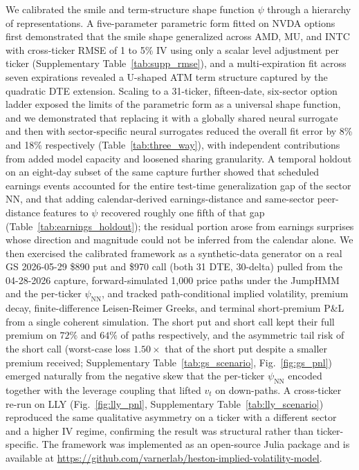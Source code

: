 We calibrated the smile and term-structure shape function $\psi$ through a hierarchy of representations. A five-parameter parametric form fitted on NVDA options first demonstrated that the smile shape generalized across AMD, MU, and INTC with cross-ticker RMSE of 1 to 5\% IV using only a scalar level adjustment per ticker (Supplementary Table~\ref{tab:supp_rmse}), and a multi-expiration fit across seven expirations revealed a U-shaped ATM term structure captured by the quadratic DTE extension. Scaling to a 31-ticker, fifteen-date, six-sector option ladder exposed the limits of the parametric form as a universal shape function, and we demonstrated that replacing it with a globally shared neural surrogate and then with sector-specific neural surrogates reduced the overall fit error by 8\% and 18\% respectively (Table~\ref{tab:three_way}), with independent contributions from added model capacity and loosened sharing granularity. A temporal holdout on an eight-day subset of the same capture further showed that scheduled earnings events accounted for the entire test-time generalization gap of the sector NN, and that adding calendar-derived earnings-distance and same-sector peer-distance features to $\psi$ recovered roughly one fifth of that gap (Table~\ref{tab:earnings_holdout}); the residual portion arose from earnings surprises whose direction and magnitude could not be inferred from the calendar alone. We then exercised the calibrated framework as a synthetic-data generator on a real GS 2026-05-29 \$890 put and \$970 call (both 31 DTE, 30-delta) pulled from the 04-28-2026 capture, forward-simulated 1{,}000 price paths under the JumpHMM and the per-ticker $\psi_{\mathrm{NN}}$, and tracked path-conditional implied volatility, premium decay, finite-difference Leisen-Reimer Greeks, and terminal short-premium P\&L from a single coherent simulation. The short put and short call kept their full premium on $72\%$ and $64\%$ of paths respectively, and the asymmetric tail risk of the short call (worst-case loss $1.50\times$ that of the short put despite a smaller premium received; Supplementary Table~\ref{tab:gs_scenario}, Fig.~\ref{fig:gs_pnl}) emerged naturally from the negative skew that the per-ticker $\psi_{\mathrm{NN}}$ encoded together with the leverage coupling that lifted $v_t$ on down-paths. A cross-ticker re-run on LLY (Fig.~\ref{fig:lly_pnl}, Supplementary Table~\ref{tab:lly_scenario}) reproduced the same qualitative asymmetry on a ticker with a different sector and a higher IV regime, confirming the result was structural rather than ticker-specific. The framework was implemented as an open-source Julia package and is available at \url{https://github.com/varnerlab/heston-implied-volatility-model}.
